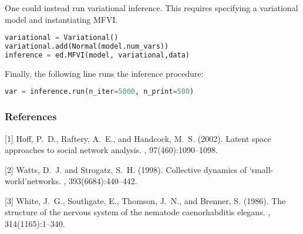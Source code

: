 One could instead run variational inference. This requires specifying a variational model and instantiating MFVI.
\begin{lstlisting}[language=Python]
variational = Variational()
variational.add(Normal(model.num_vars))
inference = ed.MFVI(model, variational,data)
\end{lstlisting}
Finally, the following line runs the inference procedure:
\begin{lstlisting}[language=Python]
var = inference.run(n_iter=5000, n_print=500)
\end{lstlisting}

\subsubsection{References}
\begin{thebibliography}{}
[1] Hoff, P.~D., Raftery, A.~E., and Handcock, M.~S. (2002).
\newblock Latent space approaches to social network analysis.
,
  97(460):1090--1098.

[2] Watts, D.~J. and Strogatz, S.~H. (1998).
\newblock Collective dynamics of ‘small-world’networks.
, 393(6684):440--442.

[3] White, J.~G., Southgate, E., Thomson, J.~N., and Brenner, S. (1986).
\newblock The structure of the nervous system of the nematode caenorhabditis
  elegans.
, 314(1165):1--340.
\end{thebibliography}

